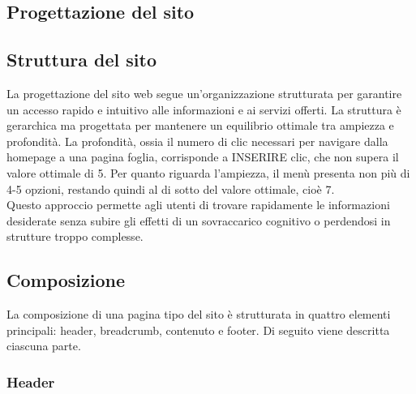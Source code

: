 \documentclass[a4paper, 12pt]{article}
\begin{document}
\begin{justify}
\section{Progettazione del sito}

\subsection{Struttura del sito}

La progettazione del sito web segue un'organizzazione strutturata per garantire un accesso rapido e intuitivo alle informazioni e ai servizi offerti. La struttura è gerarchica ma progettata per mantenere un equilibrio ottimale tra ampiezza e profondità. La profondità, ossia il numero di clic necessari per navigare dalla homepage a una pagina foglia, corrisponde a INSERIRE clic, che non supera il valore ottimale di 5. Per quanto riguarda l'ampiezza, il menù presenta non più di 4-5 opzioni, restando quindi al di sotto del valore ottimale, cioè 7.\\
Questo approccio permette agli utenti di trovare rapidamente le informazioni desiderate senza subire gli effetti di un sovraccarico cognitivo o perdendosi in strutture troppo complesse.

\subsection{Composizione}

La composizione di una pagina tipo del sito è strutturata in quattro elementi principali: header, breadcrumb, contenuto e footer. Di seguito viene descritta ciascuna parte.

\subsubsection{Header}


\end{justify}
\end{document}

